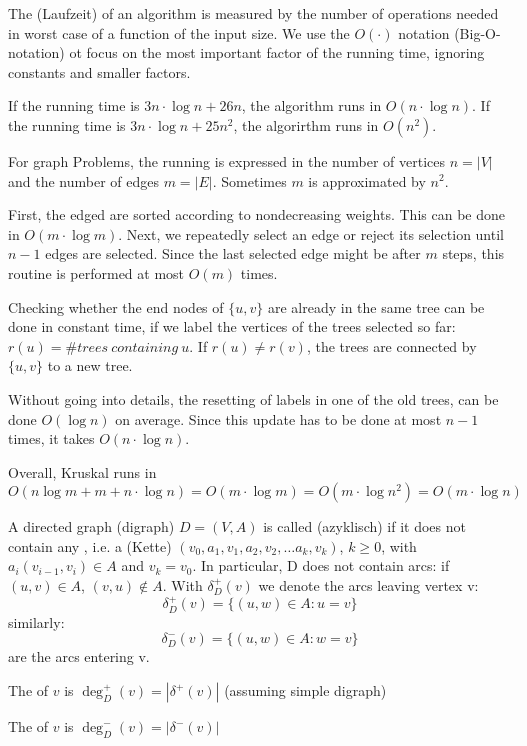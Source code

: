 \begin{lec}[2011-10-17]\end{lec}

\begin{defn+}
The  (Laufzeit) of an algorithm is measured by the number of operations needed in worst case of a function of the input size. We use the $O(\cdot)$ notation (Big-O-notation) ot focus on the most important factor of the running time, ignoring constants and smaller factors.
\end{defn+}

\begin{xmp+}
	If the running time is $3n \cdot \log n + 26n$, the algorithm runs in $O(n \cdot \log n)$. If the running time is $3n \cdot \log n + 25 n^2$, the algorirthm runs in $O(n^2)$.
\end{xmp+}

For graph Problems, the running is expressed in the number of vertices $n=|V|$ and the number of edges $m=|E|$. Sometimes $m$ is approximated by $n^2$.

\begin{xmp+}
	First, the edged are sorted according to nondecreasing weights. This can be done in $O(m\cdot \log m)$. Next, we repeatedly select an edge or reject its selection until $n-1$ edges are selected. Since the last selected edge might be after $m$ steps, this routine is performed at most $O(m)$ times.
	
	Checking whether the end nodes of $\{u,v\}$ are already in the same tree can be done in constant time, if we label the vertices of the trees selected so far: $r(u) = \# trees\: containing\: u$. If $r(u) \neq r(v)$, the trees are connected by $\{u,v\}$ to a new tree. 
	
	Without going into details, the resetting of labels in one of the old trees, can be done $O(\log n)$ on average. Since this update has to be done at most $n-1$ times, it takes $O(n\cdot \log n)$. 
	
	Overall, Kruskal runs in \[ O(n \log m + m + n \cdot \log n) = O(m \cdot \log m) = O(m \cdot \log n^2) = O(m \cdot \log n) \]
\end{xmp+}

\begin{defn+}
A directed graph (digraph) $D=(V,A)$  is called  (azyklisch) if it does not contain any , i.e. a  (Kette) $(v_0,a_1,v_1,a_2,v_2, … a_k,v_k)$, $k \geq 0$, with $a_i(v_{i-1},v_i) \in A$ and $v_k = v_0$. In particular, D does not contain  arcs: if $(u,v)\in A$, $(v,u)\not \in A$. With $\delta_D^+(v)$ we denote the arcs leaving vertex v: 
\[ \delta_D^+(v) = \{(u,w) \in A: u = v\}\]
similarly:
\[\delta_D^-(v) = \{(u,w) \in A: w = v\}\]
are the arcs entering v.

The  of $v$ is $\deg^+_D(v) = | \delta^+(v) |$ (assuming simple digraph)

The  of $v$ is $\deg^-_D(v) = | \delta^-(v)|$
\end{defn+}

